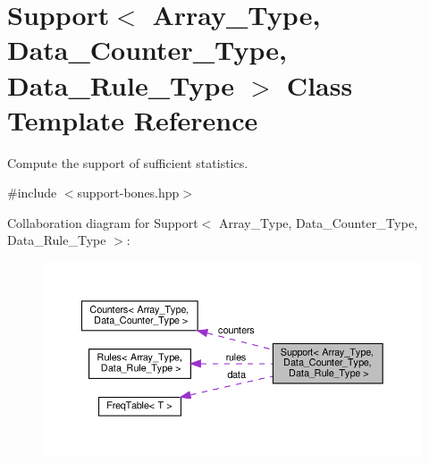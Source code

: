 \hypertarget{class_support}{}\section{Support$<$ Array\+\_\+\+Type, Data\+\_\+\+Counter\+\_\+\+Type, Data\+\_\+\+Rule\+\_\+\+Type $>$ Class Template Reference}
\label{class_support}


Compute the support of sufficient statistics.  




{\ttfamily \#include $<$support-\/bones.\+hpp$>$}



Collaboration diagram for Support$<$ Array\+\_\+\+Type, Data\+\_\+\+Counter\+\_\+\+Type, Data\+\_\+\+Rule\+\_\+\+Type $>$\+:\nopagebreak
\begin{figure}[H]
\begin{center}
\leavevmode
\includegraphics[width=350pt]{class_support__coll__graph}
\end{center}
\end{figure}
